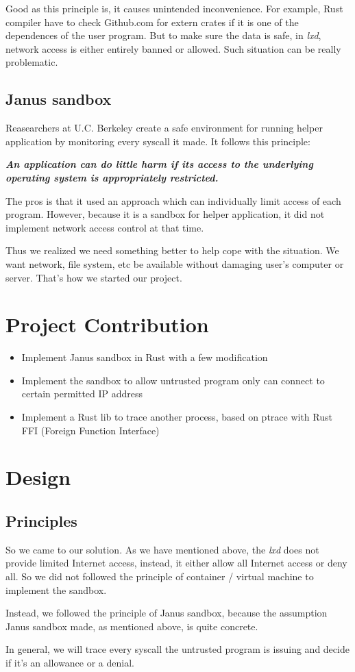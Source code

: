 \documentclass[conference,compsoc]{IEEEtran}
\begin{document}
			\par
				Good as this principle is, it causes unintended inconvenience. 
				For example, Rust compiler have to check Github.com for extern crates if it is one of the dependences of the user program. 
				But to make sure the data is safe, in \emph{lxd}, network access is either entirely banned or allowed.
				Such situation can be really problematic.
		\subsection{Janus sandbox}
			\par
				Reasearchers at U.C. Berkeley create a safe environment for running helper application by monitoring every syscall it made. It follows this principle:
				\par
				\emph{\textbf{
					An application can do little harm if its access to the underlying operating system is appropriately restricted.\cite{goldberg1996secure}
				}}
				\par
				The pros is that it used an approach which can individually limit access of each program.
				However, because it is a sandbox for helper application, it did not implement network access control at that time.
		\par
			Thus we realized we need something better to help cope with the situation. 
			We want network, file system, etc be available without damaging user's computer or server. 
			That's how we started our project.
\section {Project Contribution}
\begin{itemize}
	\item{Implement Janus sandbox in Rust with a few modification}
	\item{Implement the sandbox to allow untrusted program only can connect to certain permitted IP address}
	\item{Implement a Rust lib to trace another process, based on ptrace with Rust FFI (Foreign Function Interface)}
\end{itemize}
\section {Design}
	\subsection{Principles}
		\par
			So we came to our solution. As we have mentioned above, the \emph{lxd} does not provide limited Internet access, instead, it either allow all Internet access or deny all. So we did not followed the principle of container / virtual machine to implement the sandbox.
			\par
			Instead, we followed the principle of Janus sandbox, because the assumption Janus sandbox made, as mentioned above, is quite concrete.
			\par
			In general, we will trace every syscall the untrusted program is issuing and decide if it's an allowance or a denial.
\end{document}
